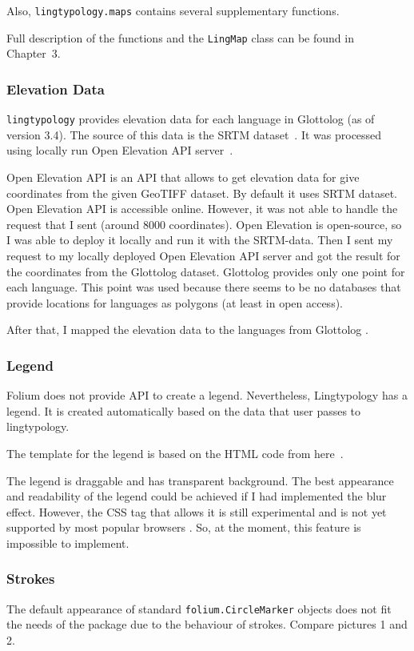 \documentclass[a4paper,12pt]{article}
\begin{document}
Also, \texttt{lingtypology.maps} contains several supplementary functions.

Full description of the functions and the \texttt{LingMap} class can be found in Chapter~3.

\subsubsection{Elevation Data}
\texttt{lingtypology} provides elevation data for each language in Glottolog (as of version 3.4). The source of this data is the SRTM dataset~\parencite{SRTM}.
It was processed using locally run Open Elevation API server~\parencite{OpenElevation}.

Open Elevation API is an API that allows to get elevation data for give coordinates from the given GeoTIFF dataset. By default it uses SRTM dataset. Open Elevation API is accessible online. However, it was not able to handle the request that I sent (around 8000 coordinates). Open Elevation is open-source, so I was able to deploy it locally and run it with the SRTM-data. Then I sent my request to my locally deployed Open Elevation API server and got the result for the coordinates from the Glottolog dataset. Glottolog provides only one point for each language. This point was used because there seems to be no databases that provide locations for languages as polygons (at least in open access).

After that, I mapped the elevation data to the languages from Glottolog \parencite[language\_elevation\_mapping.json]{MichaelVoronov2019}.

\subsubsection{Legend}
Folium does not provide API to create a legend. Nevertheless, Lingtypology has a legend. It is created automatically based on the data that user passes to lingtypology.

The template for the legend is based on the HTML code from here~\parencite{legend}.

The legend is draggable and has transparent background. The best appearance and readability of the legend could be achieved if I had implemented the blur effect. However, the CSS tag that allows it is still experimental and is not yet supported by most popular browsers \parencite{backdropFilter}. So, at the moment, this feature is impossible to implement.

\subsubsection{Strokes}
The default appearance of standard \texttt{folium.CircleMarker} objects does not fit the needs of the package due to the behaviour of strokes. Compare pictures 1 and 2.
\end{document}
